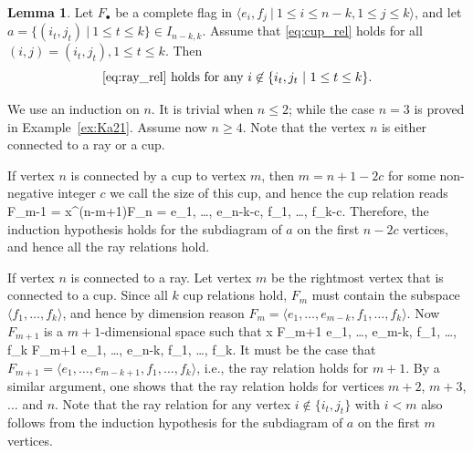\documentclass[11pt,reqno]{amsart}
\numberwithin{equation}{section}
\theoremstyle{definition}
\newtheorem{lemma}[theorem]{Lemma}
\def\<{\langle}
\def\>{\rangle}
\newcommand{\cB}{\mathcal{B}}
\newcommand{\inv}{^{-1}}
\newcommand{\cupaa}{\begin{tikzpicture}[baseline={(0,-.3)}, scale = 0.8]
\draw (-.25,0) -- (1.75,0) -- (1.75,-.9) -- (-.25,-.9) -- cycle;
\begin{footnotesize}
\node at (0,.2) {$1$};
\node at (.5,.2) {$2$};
\node at (1,.2) {$3$};
\node at (1.5,.2) {$4$};
\end{footnotesize}
\draw[thick] (0.5,0) .. controls +(0,-.5) and +(0,-.5) .. +(.5,0);
\draw[thick] (0,0) .. controls +(0,-1) and +(0,-1) .. +(1.5,0);
\end{tikzpicture}
}
\newcommand{\cupab}{\begin{tikzpicture}[baseline={(0,-.3)}, scale = 0.8]
\draw (-.25,0) -- (1.75,0) -- (1.75,-.9) -- (-.25,-.9) -- cycle;
\begin{footnotesize}
\node at (0,.2) {$1$};
\node at (.5,.2) {$2$};
\node at (1,.2) {$3$};
\node at (1.5,.2) {$4$};
\end{footnotesize}
\draw[thick] (0,0) .. controls +(0,-.5) and +(0,-.5) .. +(.5,0);
\draw[thick] (1,0) .. controls +(0,-.5) and +(0,-.5) .. +(.5,0);
\end{tikzpicture}
}
\begin{document}
\begin{lemma}
Let $F_\bullet$ be a complete flag in $\<e_i, f_j ~|~ 1\leq i \leq n-k, 1\leq j \leq k\>$, and let $a = \{ (i_t, j_t) ~|~1\leq t \leq k \} \in I_{n-k,k}$.
Assume that \eqref{eq:cup_rel} holds for all $(i,j) = (i_t, j_t), 1\leq t \leq k$. Then
\[
\eqref{eq:ray_rel} \textup{ holds for any }i \not\in \{i_t, j_t ~|~ 1\leq t \leq k\}.
\]
\end{lemma}
\proof
We use an induction on $n$. It is trivial when $n\leq 2$; while the case $n = 3$ is proved in Example~\ref{ex:Ka21}.
Assume now $n \geq 4$. Note that the vertex $n$ is either connected to a ray or a cup.

If vertex $n$ is connected by a cup to vertex $m$, then $m = n +1 - 2c$ for some non-negative integer $c$ we call the size of this cup, and hence the cup relation reads
\eq
F_{m-1} = x^{(n-m+1)}F_n
= \< e_1, \ldots, e_{n-k-c}, f_1, \ldots, f_{k-c}\>.
\endeq 
Therefore, the induction hypothesis holds for the subdiagram of $a$ on the first $n-2c$ vertices, and hence all the ray relations hold.

If vertex $n$ is connected to a ray. Let vertex $m$ be the rightmost vertex that is connected to a cup.
Since all $k$ cup relations hold, $F_m$ must contain the subspace $\<f_1, \ldots, f_k\>$, and hence by dimension reason $F_m = \<e_1, \ldots, e_{m-k}, f_1, \ldots, f_k\>$.
Now $F_{m+1}$ is a $m+1$-dimensional space such that   
\eq
x F_{m+1} \subseteq
 \<e_1, \ldots, e_{m-k}, f_1, \ldots, f_k\>
 \subset
F_{m+1} \subset
\<e_1, \ldots, e_{n-k}, f_1, \ldots, f_k\>.
\endeq
It must be the case that $F_{m+1} =  \<e_1, \ldots, e_{m-k+1}, f_1, \ldots, f_k\>$, i.e., the ray relation holds for $m+1$.
By a similar argument, one shows that the ray relation holds for vertices $m+2$, $m+3$,$\ldots$ and $n$.
Note that the ray relation for any vertex $i \not\in\{i_t, j_t\}$ with $i < m$ also follows from the induction hypothesis for the subdiagram of $a$ on the first $m$ vertices.
\endproof
\end{document}

